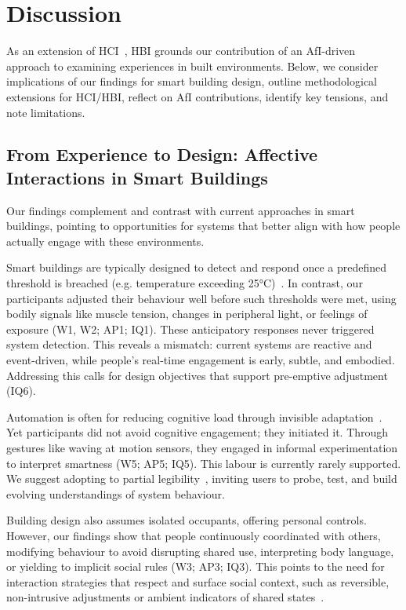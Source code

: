 \section{Discussion}
\label{sec:ch3-discussion}

As an extension of HCI~\cite{alavi2019introduction}, HBI grounds our contribution of an AfI-driven approach to examining experiences in built environments. Below, we consider implications of our findings for smart building design, outline methodological extensions for HCI/HBI, reflect on AfI contributions, identify key tensions, and note limitations.

\subsection{From Experience to Design: Affective Interactions in Smart Buildings}
Our findings complement and contrast with current approaches in smart buildings, pointing to opportunities for systems that better align with how people actually engage with these environments.

Smart buildings are typically designed to detect and respond once a predefined threshold is breached (e.g. temperature exceeding 25°C)~\cite{jazizadeh2014human, marques2020real, de2002thermal}. In contrast, our participants adjusted their behaviour well before such thresholds were met, using bodily signals like muscle tension, changes in peripheral light, or feelings of exposure (W1, W2; AP1; IQ1). These anticipatory responses never triggered system detection. This reveals a mismatch: current systems are reactive and event-driven, while people’s real-time engagement is early, subtle, and embodied. Addressing this calls for design objectives that support pre-emptive adjustment (IQ6).

Automation is often for reducing cognitive load through invisible adaptation~\cite{becerik2022ten}. Yet participants did not avoid cognitive engagement; they initiated it. Through gestures like waving at motion sensors, they engaged in informal experimentation to interpret smartness (W5; AP5; IQ5). This labour is currently rarely supported. We suggest adopting to partial legibility~\cite{lim2009and}, inviting users to probe, test, and build evolving understandings of system behaviour.

Building design also assumes isolated occupants, offering personal controls. However, our findings show that people continuously coordinated with others, modifying behaviour to avoid disrupting shared use, interpreting body language, or yielding to implicit social rules (W3; AP3; IQ3). This points to the need for interaction strategies that respect and surface social context, such as reversible, non-intrusive adjustments or ambient indicators of shared states~\cite{salim2012probing, yu2018delight}.

